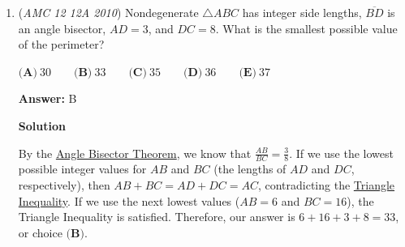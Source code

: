 \begin{enumerate}
 
 \[\sin(\theta)\cos(\theta)=\frac{1}{k}.\]

 We can see that the intersections of these two equations will remain unchanged, only now that the solutions will be in terms of $k$ and $\theta$. Because the range of both $\sin$ and $\cos$ are limited to $[0,1]$, the range of $\sin(\theta)\cos(\theta)$ will not exceed $1$. However, the only way that the product could equal 1 is if both $\sin(\theta)$ and $\cos(\theta)$ to equal 1 at the same time, so since the maxima of the functions don't match up, this is an impossible case. Therefore, this equation will only have valid solutions when $k>1$, not at $k=1$. A quick sanity check with $\theta=\frac{\pi}{4}$ shows that $\frac{1}{k}=\frac{1}{2}$ and all values less than $\frac{1}{2}$ is indeed contained in the range.

 For all $k<0$, symmetry about the $y$-axis will give an identical argument with the equation $\sin(\theta)\cos(\theta)=-\frac{1}{k}$, with $k<-1$ producing valid solutions for our system. Then, the only two values of $k$ such that the system of equations won't intersect are $1$ and $-1$, a total of $\boxed{2}$ values.

 (Note: In the graph of $f(x)=\sin(x)\cos(x)$, the range of the function is actually even more restricted, being $\left[-\frac{1}{2},\frac{1}{2}\right]$. However, in a contest, observing that the value of $|\sin(x)\cos(x)|<1$ would suffice since the question is only asking for integer values of $k$.)

 


 


	\item (\textit{AMC 12 12A 2010}) Nondegenerate $\triangle ABC$ has integer side lengths, $\overline{BD}$ is an angle bisector, $AD = 3$, and $DC=8$. What is the smallest possible value of the perimeter?


 $\textbf{(A)}\ 30 \qquad \textbf{(B)}\ 33 \qquad \textbf{(C)}\ 35 \qquad \textbf{(D)}\ 36 \qquad \textbf{(E)}\ 37$

 \textbf{Answer: }B



\textbf{Solution}

By the \href{https://artofproblemsolving.com/wiki/index.php?title=Angle\_Bisector\_Theorem}{Angle Bisector Theorem}, we know that $\frac{AB}{BC} = \frac{3}{8}$. If we use the lowest possible integer values for $AB$ and $BC$ (the lengths of $AD$ and $DC$, respectively), then $AB + BC = AD + DC = AC$, contradicting the \href{https://artofproblemsolving.com/wiki/index.php?title=Triangle\_Inequality}{Triangle Inequality}. If we use the next lowest values ($AB = 6$ and $BC = 16$), the Triangle Inequality is satisfied. Therefore, our answer is $6 + 16 + 3 + 8 = \boxed{33}$, or choice $\textbf{(B)}$.


\end{enumerate}
